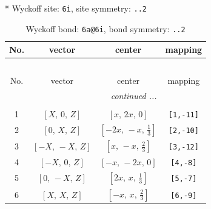 \documentclass[fleqn,8pt]{jsarticle}
\begin{document}
* Wyckoff site: {\tt 6i}, site symmetry: {\tt ..2}
\renewcommand{\arraystretch}{1.2}
\begin{longtable}{cccc}
\caption{Wyckoff bond: {\tt 6a@6i}, bond symmetry: {\tt ..2}}
 \\
 \hline \hline
No. & vector & center & mapping \\ \hline \endfirsthead

\multicolumn{3}{l}{\tablename\ \thetable{}} \\
 \hline \hline
No. & vector & center & mapping \\ \hline \endhead

 \hline \hline
\multicolumn{3}{r}{\footnotesize\it continued ...} \\ \endfoot

 \hline \hline
\multicolumn{3}{r}{} \\ \endlastfoot

1 & $\left[ X,\, 0,\, Z \right]$ & $\left[ x,\, 2 x,\, 0 \right]$ & {\tt [1,-11]} \\ \hline
2 & $\left[ 0,\, X,\, Z \right]$ & $\left[ - 2 x,\, - x,\, \frac{1}{3} \right]$ & {\tt [2,-10]} \\ \hline
3 & $\left[ - X,\, - X,\, Z \right]$ & $\left[ x,\, - x,\, \frac{2}{3} \right]$ & {\tt [3,-12]} \\ \hline
4 & $\left[ - X,\, 0,\, Z \right]$ & $\left[ - x,\, - 2 x,\, 0 \right]$ & {\tt [4,-8]} \\ \hline
5 & $\left[ 0,\, - X,\, Z \right]$ & $\left[ 2 x,\, x,\, \frac{1}{3} \right]$ & {\tt [5,-7]} \\ \hline
6 & $\left[ X,\, X,\, Z \right]$ & $\left[ - x,\, x,\, \frac{2}{3} \right]$ & {\tt [6,-9]} \\
\end{longtable}
\renewcommand{\arraystretch}{1.2}
\end{document}
